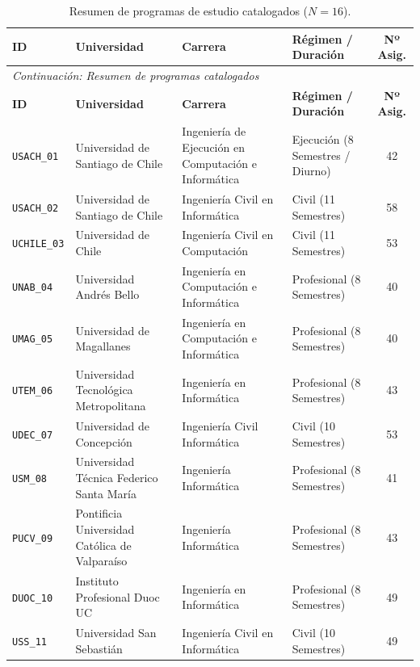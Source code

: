 \documentclass[11pt,a4paper]{article}
\begin{document}
\begin{small}
\begin{longtable}{p{2.2cm} >{\raggedright\arraybackslash}p{3.5cm} >{\raggedright\arraybackslash}p{4.2cm} >{\raggedright\arraybackslash}p{2.6cm} c}
\caption{Resumen de programas de estudio catalogados ($N=16$).} \label{tab:resumen_programas} \\
\toprule
\textbf{ID} & \textbf{Universidad} & \textbf{Carrera} & \textbf{Régimen / Duración} & \textbf{Nº Asig.} \\
\midrule
\endfirsthead
\multicolumn{5}{l}{\small\textit{Continuación: Resumen de programas catalogados}} \\[3pt]
\toprule
\textbf{ID} & \textbf{Universidad} & \textbf{Carrera} & \textbf{Régimen / Duración} & \textbf{Nº Asig.} \\
\midrule
\endhead
\bottomrule
\endfoot
\texttt{USACH\_01} & Universidad de Santiago de Chile & Ingeniería de Ejecución en Computación e Informática & Ejecución (8 Semestres / Diurno) & 42 \\
\texttt{USACH\_02} & Universidad de Santiago de Chile & Ingeniería Civil en Informática & Civil (11 Semestres) & 58 \\
\texttt{UCHILE\_03} & Universidad de Chile & Ingeniería Civil en Computación & Civil (11 Semestres) & 53 \\
\texttt{UNAB\_04} & Universidad Andrés Bello & Ingeniería en Computación e Informática & Profesional (8 Semestres) & 40 \\
\texttt{UMAG\_05} & Universidad de Magallanes & Ingeniería en Computación e Informática & Profesional (8 Semestres) & 40 \\
\texttt{UTEM\_06} & Universidad Tecnológica Metropolitana & Ingeniería en Informática & Profesional (8 Semestres) & 43 \\
\texttt{UDEC\_07} & Universidad de Concepción & Ingeniería Civil Informática & Civil (10 Semestres) & 53 \\
\texttt{USM\_08} & Universidad Técnica Federico Santa María & Ingeniería Informática & Profesional (8 Semestres) & 41 \\
\texttt{PUCV\_09} & Pontificia Universidad Católica de Valparaíso & Ingeniería Informática & Profesional (8 Semestres) & 43 \\
\texttt{DUOC\_10} & Instituto Profesional Duoc UC & Ingeniería en Informática & Profesional (8 Semestres) & 49 \\
\texttt{USS\_11} & Universidad San Sebastián & Ingeniería Civil en Informática & Civil (10 Semestres) & 49 \\

\end{longtable}
\end{small}
\end{document}
